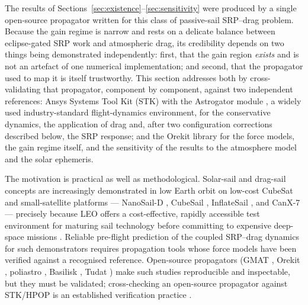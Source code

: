 \FloatBarrier
\noindent The results of Sections~\ref{sec:existence}--\ref{sec:sensitivity} were produced by a single open-source propagator written for this class of passive-sail SRP--drag problem. Because the gain regime is narrow and rests on a delicate balance between eclipse-gated SRP work and atmospheric drag, its credibility depends on two things being demonstrated independently: first, that the gain region \emph{exists} and is not an artefact of one numerical implementation; and second, that the propagator used to map it is itself trustworthy. This section addresses both by cross-validating that propagator, component by component, against two independent references: Ansys Systems Tool Kit (STK) with the Astrogator module \citep{ansysSTK2024,shortRevisitingTrajectory2019}, a widely used industry-standard flight-dynamics environment, for the conservative dynamics, the application of drag and, after two configuration corrections described below, the SRP response; and the Orekit library \citep{orekit} for the force models, the gain regime itself, and the sensitivity of the results to the atmosphere model and the solar ephemeris.

\vspace{5pt}
\par\noindent The motivation is practical as well as methodological. Solar-sail and drag-sail concepts are increasingly demonstrated in low Earth orbit on low-cost CubeSat and small-satellite platforms --- NanoSail-D \citep{johnsonNanoSailD2011}, CubeSail \citep{lappasCubeSail2011}, InflateSail \citep{underwoodInflateSail2019}, and CanX-7 \citep{boninCanX72013} --- precisely because LEO offers a cost-effective, rapidly accessible test environment for maturing sail technology before committing to expensive deep-space missions \citep{selvaCubeSatSurvey2012,woellertCubeSatCost2011}. Reliable pre-flight prediction of the coupled SRP--drag dynamics for such demonstrators requires propagation tools whose force models have been verified against a recognised reference. Open-source propagators (GMAT \citep{hughesGMATVV2014}, Orekit \citep{orekit}, poliastro \citep{canoPoliastro2022}, Basilisk \citep{kenneallyBasilisk2020}, Tudat \citep{dirkxTudatpy2022}) make such studies reproducible and inspectable, but they must be validated; cross-checking an open-source propagator against STK/HPOP is an established verification practice \citep{refaatPropagatorValidation2018,hughesGMATVV2014}.


